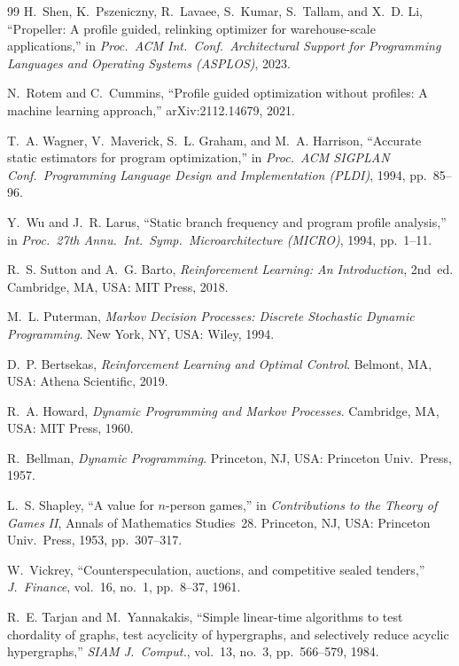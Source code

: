 \documentclass[conference]{IEEEtran}
\begin{document}
\begin{thebibliography}{99}
H.~Shen, K.~Pszeniczny, R.~Lavaee, S.~Kumar, S.~Tallam, and X.~D. Li,
``Propeller: A profile guided, relinking optimizer for warehouse-scale
applications,'' in \emph{Proc.\ ACM Int.\ Conf.\ Architectural Support
for Programming Languages and Operating Systems (ASPLOS)}, 2023.

N.~Rotem and C.~Cummins, ``Profile guided optimization without
profiles: A machine learning approach,'' arXiv:2112.14679, 2021.

T.~A. Wagner, V.~Maverick, S.~L. Graham, and M.~A. Harrison,
``Accurate static estimators for program optimization,'' in
\emph{Proc.\ ACM SIGPLAN Conf.\ Programming Language Design and
Implementation (PLDI)}, 1994, pp.~85--96.

Y.~Wu and J.~R. Larus, ``Static branch frequency and program profile
analysis,'' in \emph{Proc.\ 27th Annu.\ Int.\ Symp.\ Microarchitecture
(MICRO)}, 1994, pp.~1--11.

R.~S. Sutton and A.~G. Barto, \emph{Reinforcement Learning: An
Introduction}, 2nd~ed. Cambridge, MA, USA: MIT Press, 2018.

M.~L. Puterman, \emph{Markov Decision Processes: Discrete Stochastic
Dynamic Programming}. New York, NY, USA: Wiley, 1994.

D.~P. Bertsekas, \emph{Reinforcement Learning and Optimal Control}.
Belmont, MA, USA: Athena Scientific, 2019.

R.~A. Howard, \emph{Dynamic Programming and Markov Processes}.
Cambridge, MA, USA: MIT Press, 1960.

R.~Bellman, \emph{Dynamic Programming}. Princeton, NJ, USA: Princeton
Univ.\ Press, 1957.

L.~S. Shapley, ``A value for $n$-person games,'' in \emph{Contributions
to the Theory of Games II}, Annals of Mathematics Studies~28.
Princeton, NJ, USA: Princeton Univ.\ Press, 1953, pp.~307--317.

W.~Vickrey, ``Counterspeculation, auctions, and competitive sealed
tenders,'' \emph{J.~Finance}, vol.~16, no.~1, pp.~8--37, 1961.

R.~E. Tarjan and M.~Yannakakis, ``Simple linear-time algorithms to test
chordality of graphs, test acyclicity of hypergraphs, and selectively
reduce acyclic hypergraphs,'' \emph{SIAM J.\ Comput.}, vol.~13, no.~3,
pp.~566--579, 1984.


\end{thebibliography}
\end{document}
